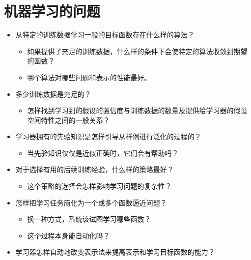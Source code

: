 \documentclass{beamer}
\begin{document}
\section{机器学习的问题}
\label{sec-5}


\begin{itemize}
\item 从特定的训练数据学习一般的目标函数存在什么样的算法？
\begin{itemize}
\item 如果提供了充足的训练数据，什么样的条件下会使特定的算法收敛到期望的函数？
\item 哪个算法对哪些问题和表示的性能最好。
\end{itemize}
\item 多少训练数据是充足的？
\begin{itemize}
\item 怎样找到学习到的假设的置信度与训练数据的数量及提供给学习器的假设空间特性之间的一般关系？
\end{itemize}
\item 学习器拥有的先验知识是怎样引导从样例进行泛化的过程的？
\begin{itemize}
\item 当先验知识仅仅是近似正确时，它们会有帮助吗？
\end{itemize}
\item 对于选择有用的后续训练经验，什么样的策略最好？
\begin{itemize}
\item 这个策略的选择会怎样影响学习问题的复杂性？
\end{itemize}
\item 怎样把学习任务简化为一个或多个函数逼近问题？
\begin{itemize}
\item 换一种方式，系统该试图学习哪些函数？
\item 这个过程本身能自动化吗？
\end{itemize}
\item 学习器怎样自动地改变表示法来提高表示和学习目标函数的能力？
\end{itemize}
\end{document}
